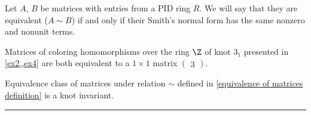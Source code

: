 \begin{definition}\label{equivalence of matrices definition}
  Let $A$, $B$ be matrices with entries from a PID ring $R$. We will say that they are equivalent ($A\sim B$) if and only if their Smith's normal form has the same nonzero and nonunit terms.
\end{definition}

\begin{example}
  Matrices of coloring homomorphisms over the ring $\Z$ of knot $3_1$ presented in \cref{ex2,,ex4} are both equivalent to a $1\times 1$ matrix $\begin{pmatrix}3\end{pmatrix}$.
\end{example}

\begin{theorem}
  Equivalence class of matrices under relation $\sim$ defined in \cref{equivalence of matrices definition} is a knot invariant.
\end{theorem}







\bigskip

\rule{\textwidth}{1pt}
\bigskip

